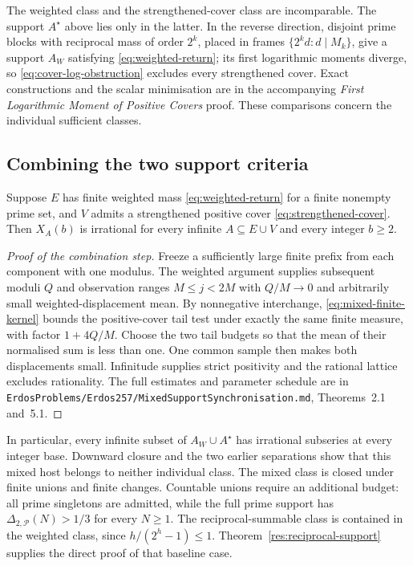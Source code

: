 \documentclass[11pt]{article}
\begin{document}
The weighted class and the strengthened-cover class are incomparable.
The support $A^\star$ above lies only in the latter.  In the reverse
direction, disjoint prime blocks with reciprocal mass of order $2^k$,
placed in frames $\{2^kd:d\mid M_k\}$, give a support $A_W$ satisfying
\eqref{eq:weighted-return}; its first logarithmic moments diverge,
so \eqref{eq:cover-log-obstruction} excludes every strengthened cover.
Exact constructions and the scalar minimisation are in the accompanying
\emph{First Logarithmic Moment of Positive Covers} proof.
These comparisons concern the individual sufficient classes.

\subsection{Combining the two support criteria}
\begin{theorem}\label{res:mixed-supports}
Suppose $E$ has finite weighted mass \eqref{eq:weighted-return} for a
finite nonempty prime set, and $V$ admits a strengthened positive cover
\eqref{eq:strengthened-cover}.  Then $X_A(b)$ is irrational for every
infinite $A\subseteq E\cup V$ and every integer $b\ge2$.
\end{theorem}
\begin{proof}[Proof of the combination step]
Freeze a sufficiently large finite prefix from each component with one
modulus.  The weighted argument supplies subsequent moduli $Q$ and
observation ranges $M\le j<2M$ with $Q/M\to0$ and arbitrarily small
weighted-displacement mean.  By nonnegative interchange,
\eqref{eq:mixed-finite-kernel} bounds the positive-cover tail test under
exactly the same finite measure, with factor $1+4Q/M$.
Choose the two tail budgets so that the mean of their normalised sum is
less than one.  One common sample then makes both displacements small.
Infinitude supplies strict positivity and the rational lattice excludes
rationality.  The full estimates and parameter schedule are in
\texttt{ErdosProblems/Erdos257/MixedSupportSynchronisation.md},
Theorems~2.1 and~5.1.
\end{proof}

In particular, every infinite subset of $A_W\cup A^\star$ has irrational
subseries at every integer base.  Downward closure and the two earlier
separations show that this mixed host belongs to neither individual class.
The mixed class is closed under finite unions and finite changes.
Countable unions require an additional budget: all prime singletons are
admitted, while the full prime support has
$\Delta_{2,\mathcal P}(N)>1/3$ for every $N\ge1$.
The reciprocal-summable class is contained in the weighted class, since
$h/(2^h-1)\le1$.  Theorem~\ref{res:reciprocal-support} supplies the direct
proof of that baseline case.
\end{document}
